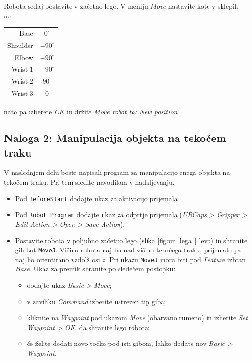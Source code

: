 Robota sedaj postavite v začetno lego.  V meniju \emph{Move} nastavite kote v sklepih na

\begin{tabular}{|r|c|}
  \hline
  Base & $0^\circ$ \\
  Shoulder & $-90^\circ$ \\
  Elbow & $-90^\circ$ \\
  Wrist 1 & $-90^\circ$ \\
  Wrist 2 & $90^\circ$ \\
  Wrist 3 & 0 \\
  \hline
\end{tabular}

nato pa izberete \emph{OK} in držite \emph{Move robot to: New position}.



\subsection{Naloga 2: Manipulacija objekta na tekočem traku}

V naslednjem delu boste napisali program za manipulacijo enega objekta na tekočem traku. Pri tem sledite navodilom v nadaljevanju.

\begin{mdframed}[backgroundcolor=yellow!20, shadow=true,roundcorner=8pt]
\begin{itemize}
  \item Pod \verb"BeforeStart" dodajte ukaz za aktivacijo prijemala
  \item Pod \verb"Robot Program" dodajte ukaz za odprtje prijemala (\emph{URCaps > Gripper > Edit Action > Open > Save Action}).
  \item Postavite robota v poljubno začetno lego (slika \ref{fig:ur_lega1} levo) in shranite gib kot \verb"MoveJ". Višina robota naj bo nad višino tekočega traku, prijemalo pa naj bo orientirano vzdolž osi z. Pri ukazu \verb"MoveJ" mora biti pod \emph{Feature} izbran \emph{Base}. Ukaz za premik shranite po sledečem postopku:
      \begin{itemize}
        \item dodajte ukaz \emph{Basic > Move};
        \item v zavihku \emph{Command} izberite ustrezen tip giba;
        \item kliknite na \emph{Waypoint} pod ukazom \emph{Move} (obarvano rumeno) in izberite \emph{Set Waypoint > OK}, da shranite lego robota;
        \item če želite dodati novo točko pod isti gibom, lahko dodate nov \emph{Basic > Waypoint}.
      \end{itemize}

       \end{itemize}
\end{mdframed}

